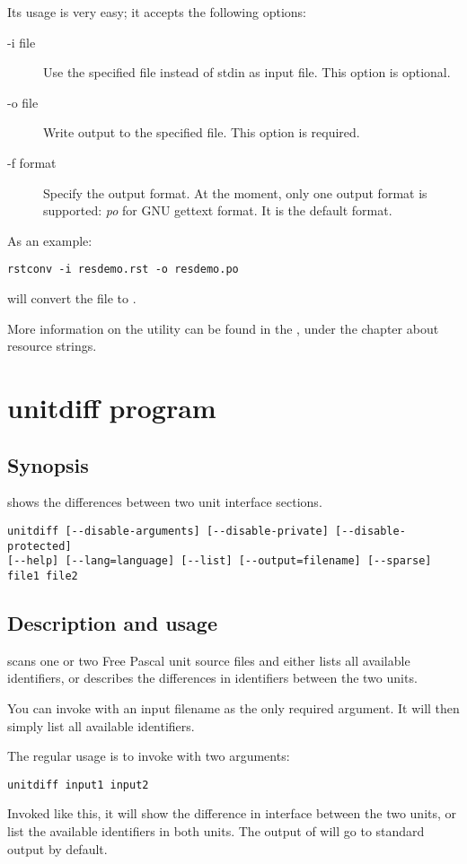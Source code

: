 Its usage is very easy; it accepts the following options:
\begin{description}
\item[-i file] Use the specified file instead of stdin as input file. This
option is optional.
\item[-o file] Write output to the specified file. This option is required.
\item[-f format] Specify the output format. At the moment, only one output
format is supported: {\em po} for GNU gettext  format.
It is the default format.
\end{description}
As an example:
\begin{verbatim}
rstconv -i resdemo.rst -o resdemo.po
\end{verbatim}
will convert the  file to .

More information on the  utility can be found in the \progref,
under the chapter about resource strings.

\section{unitdiff program}

\subsection{Synopsis}
 shows the differences between two unit interface sections.
\begin{verbatim}
unitdiff [--disable-arguments] [--disable-private] [--disable-protected]
[--help] [--lang=language] [--list] [--output=filename] [--sparse]
file1 file2
\end{verbatim}

\subsection{Description and usage}

 scans one or two Free Pascal unit source files and either lists all
available identifiers, or describes the differences in identifiers
between the two units.

You can invoke  with an input filename as the only required
argument. It will then simply list all available identifiers.

The regular usage is to invoke  with two arguments:
\begin{verbatim}
unitdiff input1 input2
\end{verbatim}
Invoked like this, it will show the difference in interface between the two
units, or list the available identifiers in both units. The output of
 will go to standard output by default.

